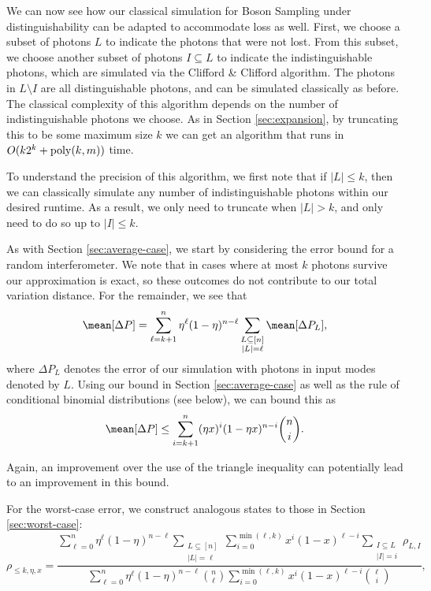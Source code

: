 We can now see how our classical simulation for Boson Sampling under distinguishability can be adapted to accommodate loss as well. 
First, we choose a subset of photons $L$ to indicate the photons that were not lost. 
From this subset, we choose another subset of photons $I\subseteq L$ to indicate the indistinguishable photons, which are simulated via the Clifford \& Clifford algorithm. 
The photons in $L\setminus I$ are all distinguishable photons, and can be simulated classically as before. 
The classical complexity of this algorithm depends on the number of indistinguishable photons we choose. 
As in Section \ref{sec:expansion}, by truncating this to be some maximum size $k$ we can get an algorithm that runs in $O(k2^k+\operatorname{poly}(k,m))$ time.

To understand the precision of this algorithm, we first note that if $|L|\leq k$, then we can classically simulate any number of indistinguishable photons within our desired runtime. 
As a result, we only need to truncate when $|L|>k$, and only need to do so up to $|I|\leq k$. 

As with Section \ref{sec:average-case}, we start by considering the error bound for a random interferometer. We note that in cases where at most $k$ photons survive our approximation is exact, so these outcomes do not contribute to our total variation distance. 
For the remainder, we see that
\begin{equation}
\mean[\Delta P] = \sum_{\ell=k+1}^n\eta^\ell(1-\eta)^{n-\ell}\sum_{\substack{L\subseteq[n]\\|L|=\ell}}\mean[\Delta P_L],
\end{equation}
where $\Delta P_L$ denotes the error of our simulation with photons in input modes denoted by $L$. 
Using our bound in Section \ref{sec:average-case} as well as the rule of conditional binomial distributions (see below), we can bound this as
\begin{equation}
\mean[\Delta P] \leq \sum_{i=k+1}^n(\eta x)^i(1-\eta x)^{n-i}\binom{n}{i}.
\end{equation}

Again, an improvement over the use of the triangle inequality can potentially lead to an improvement in this bound.


For the worst-case error, we construct analogous states to those in Section \ref{sec:worst-case}:
\begin{equation}
\rho_{\leq k,\eta,x} = \frac{\sum_{\ell=0}^n\eta^\ell(1-\eta)^{n-\ell}\sum_{\substack{L\subseteq[n]\\|L|=\ell}}\sum_{i=0}^{\min(\ell,k)} x^i(1-x)^{\ell-i}\sum_{\substack{I\subseteq L\\|I|=i}}\rho_{L,I}}{\sum_{\ell=0}^n\eta^\ell(1-\eta)^{n-\ell}\binom{n}{\ell}\sum_{i=0}^{\min(\ell,k)} x^i(1-x)^{\ell-i}\binom{\ell}{i}},
\end{equation}

